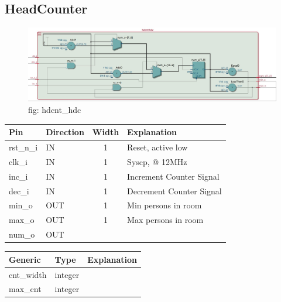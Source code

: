 \documentclass[12pt,a4 paper] {report}
\begin{document}
\subsection{HeadCounter}
\begin{figure}[h]
	\centering	
	\includegraphics[scale=0.3]{../png/hdcnt_hdc.png}
	\newline
	fig: hdcnt\_hdc \\
\end{figure}
\begin{center}
	\begin{tabular}{| p{2cm} | p{2cm} | c| p{4cm} |}
		\hline
		Pin & Direction & Width & Explanation\\
		\hline	
		rst\_n\_i &  IN  & 1 &  Reset, active low \\
		\hline
		clk\_i &   IN  & 1 &          Syscp, @ 12MHz\\
		\hline
		inc\_i  &  IN & 1 &           Increment Counter Signal\\
		\hline
		dec\_i   & IN   & 1 &         Decrement Counter Signal\\
		\hline
		min\_o   & OUT  & 1 &         Min persons in room\\
		\hline
		max\_o   & OUT   & 1 &        Max persons in room\\
		\hline
		num\_o   & OUT &  & \\
		\hline
	\end{tabular}
\end{center}
\begin{center}
	\begin{tabular}{| p{2cm} | p{2cm} | p{4cm} |}
		\hline
		Generic & Type & Explanation \\
		\hline
		cnt\_width  & integer & \\
		\hline
		max\_cnt & integer & \\
		\hline
	\end{tabular}	
\end{center}


\newpage
\end{document}
